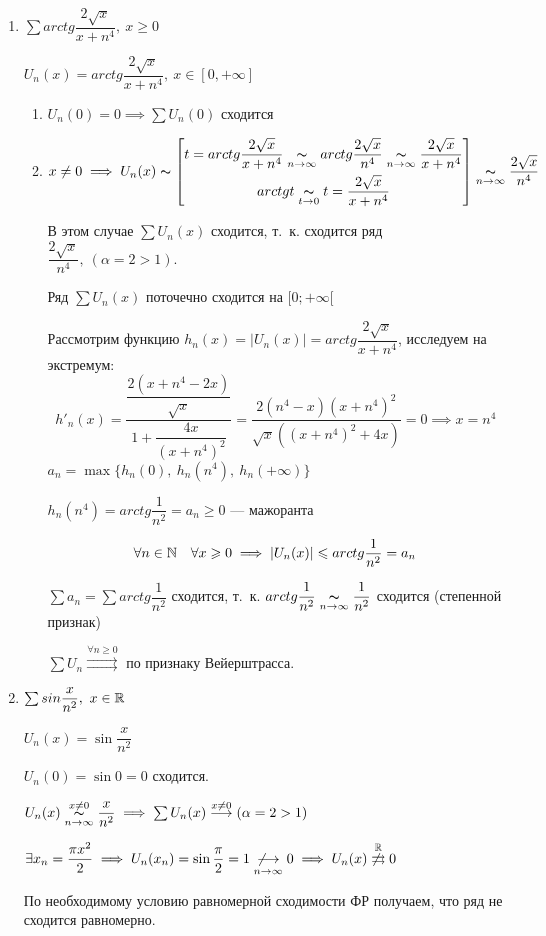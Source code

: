 \documentclass[../../main.tex]{subfiles}
\begin{document}
\begin{exmps}
	\;
	\begin{enumerate}
		\item $\sum arctg\dfrac{2\sqrt{x}}{x+n^4},\ x \geq 0$

$U_n(x) = arctg\dfrac{2\sqrt{x}}{x+n^4},\ x \in [0,+\infty]$
	\begin{enumerate}
		\item $U_n(0) = 0 \implies \sum U_n(0)$ сходится
		\item $x \neq 0 \implies U_n(x) \thicksim 
	\left[ \begin{gathered}
	t = arctg\dfrac{2\sqrt{x}}{x+n^4} \underset{n \to \infty}{\thicksim} 
	arctg\dfrac{2\sqrt{x}}{n^4} \underset{n \to \infty}{\thicksim}
	\dfrac{2\sqrt{x}}{x+n^4} \\
	arctgt \underset{t \to 0}{\thicksim}
	t = \dfrac{2\sqrt{x}}{x+n^4}
	\end{gathered} \right] \underset{n \to \infty}{\thicksim}
	\dfrac{2\sqrt{x}}{n^4}$
	
	В этом случае $\sum U_n(x)$ сходится, т.~к. сходится ряд 
	$\dfrac{2\sqrt{x}}{n^4},\ (\alpha = 2 > 1)$.
	
	Ряд $\sum U_n(x)$ поточечно сходится на $[0;+\infty[$
	
	Рассмотрим функцию $h_n(x) = |U_n(x)| = arctg\dfrac{2\sqrt{x}}{x+n^4}$, 
	исследуем на экстремум: \\
	\[
	h'_n(x) = \dfrac{\dfrac{2(x + n^4 - 2x)}{\sqrt{x}}}
	{1 + \dfrac{4x}{(x+n^4)^2}} = \dfrac{2(n^4-x)(x+n^4)^2}
	{\sqrt{x}((x+n^4)^2+4x)} = 0 \implies x = n^4
	\]
	$a_n = \max\{ h_n(0),\ h_n(n^4),\ h_n(+\infty) \}$
	
	$ h_n(n^4) = arctg\dfrac{1}{n^2} = a_n \geq 0$ --- мажоранта
	
	\[
	\forall n \in \mathbb{N} \quad \forall x \geqslant 0 \implies |U_n(x)| \leqslant 
	arctg\dfrac{1}{n^2} = a_n
	\]
	
	$\sum a_n = \sum arctg\dfrac{1}{n^2}$ сходится, т.~к. 
	$arctg\dfrac{1}{n^2} \underset{n \to \infty}{\thicksim}
	\dfrac{1}{n^2}$ сходится (степенной признак)
	
	$\sum U_n \overset{\forall n \geq 0}{\rightrightarrows}$ 
	по признаку Вейерштрасса.
	\end{enumerate}	

	\item $\sum sin\dfrac{x}{n^2},\ x \in \mathbb{R}$ 	 
	
	$U_n(x) = \sin\dfrac{x}{n^2}$
	
	$U_n(0) = \sin0 = 0$ сходится.
	
	$U_n(x) \overset{x \neq 0}{\underset{n \to \infty}\thicksim} 
	\dfrac{x}{n^2} \implies \sum U_n(x) \overset{x \neq 0}{\longrightarrow}
	(\alpha = 2 > 1)$	
	
	$\exists x_n = \dfrac{\pi x^2}{2} \implies U_n(x_n) = 
	\sin\dfrac{\pi}{2} = 1 \underset{n \to \infty}
	{\not \longrightarrow} 0 \implies
	U_n(x) \overset{\mathbb{R}}{\not \rightrightarrows} 0$

	По необходимому условию равномерной сходимости ФР получаем, что ряд 
	не сходится равномерно.
	\end{enumerate}	
\end{exmps}	
\end{document}
